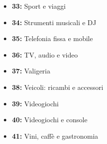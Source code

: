 \begin{itemize}
\item \textbf{33:} Sport e viaggi
\item \textbf{34:} Strumenti musicali e DJ
\item \textbf{35:} Telefonia fissa e mobile
\item \textbf{36:} TV, audio e video
\item \textbf{37:} Valigeria
\item \textbf{38:} Veicoli: ricambi e accessori
\item \textbf{39:} Videogiochi
\item \textbf{40:} Videogiochi e console
\item \textbf{41:} Vini, caffè e gastronomia
\end{itemize}



